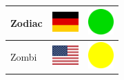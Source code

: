 \documentclass[12pt, a4paper, twoside]{report}
\begin{document}
\begin{center}
\begin{longtable}{|p{5cm}|p{2cm}|p{2cm}|}
 Zodiac                                                     & \includegraphics[width=1cm]{4x3/de} &   \includegraphics[width=1cm]{likes/y} \\ \hline
 Zombi                                                      & \includegraphics[width=1cm]{4x3/us} &   \includegraphics[width=1cm]{likes/m} \\ \hline
		\end{longtable}
	\end{center}
\end{document}
